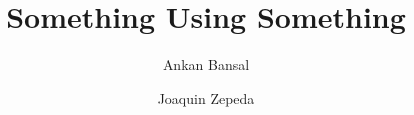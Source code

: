 \documentclass[10pt,twocolumn,letterpaper]{article}
\begin{document}
\title{Something Using Something}

\author{Ankan Bansal\\
\and
Joaquin Zepeda\\
}

\maketitle










{\small


}
\end{document}
